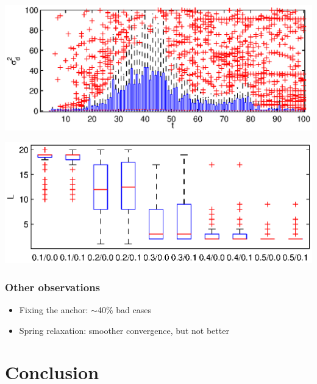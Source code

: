 \documentclass{beamer}
\begin{document}
\begin{frame}
    \includegraphics[width=\columnwidth]{schemas/set4-sd-nosrf.eps}
\end{frame}

\begin{frame}
    \includegraphics[width=\columnwidth]{schemas/set3-L.eps}
\end{frame}

\begin{frame}
    \frametitle{Other observations}
    \begin{itemize}
        \item Fixing the anchor: $\sim$40\% bad cases \\
        \item Spring relaxation: smoother convergence, but not better \\
    \end{itemize}
\end{frame}
\section{Conclusion}
\end{document}
